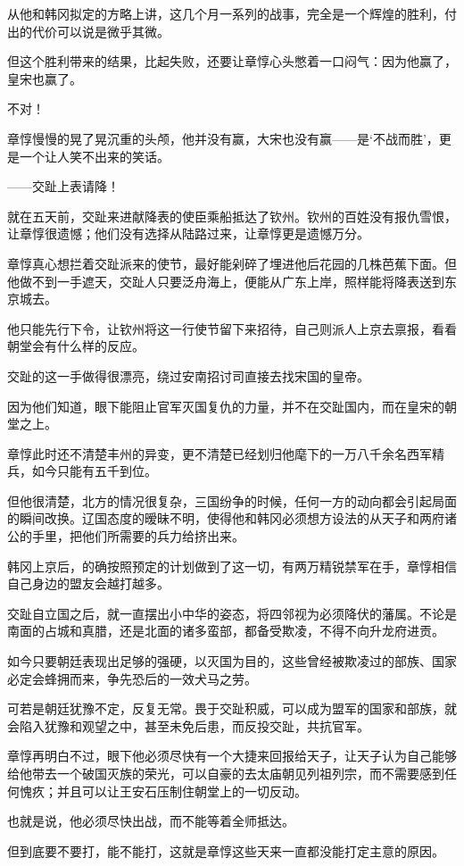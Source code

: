 从他和韩冈拟定的方略上讲，这几个月一系列的战事，完全是一个辉煌的胜利，付出的代价可以说是微乎其微。

但这个胜利带来的结果，比起失败，还要让章惇心头憋着一口闷气：因为他赢了，皇宋也赢了。

不对！

章惇慢慢的晃了晃沉重的头颅，他并没有赢，大宋也没有赢——是‘不战而胜’，更是一个让人笑不出来的笑话。

——交趾上表请降！

就在五天前，交趾来进献降表的使臣乘船抵达了钦州。钦州的百姓没有报仇雪恨，让章惇很遗憾；他们没有选择从陆路过来，让章惇更是遗憾万分。

章惇真心想拦着交趾派来的使节，最好能剁碎了埋进他后花园的几株芭蕉下面。但他做不到一手遮天，交趾人只要泛舟海上，便能从广东上岸，照样能将降表送到东京城去。

他只能先行下令，让钦州将这一行使节留下来招待，自己则派人上京去禀报，看看朝堂会有什么样的反应。

交趾的这一手做得很漂亮，绕过安南招讨司直接去找宋国的皇帝。

因为他们知道，眼下能阻止官军灭国复仇的力量，并不在交趾国内，而在皇宋的朝堂之上。

章惇此时还不清楚丰州的异变，更不清楚已经划归他麾下的一万八千余名西军精兵，如今只能有五千到位。

但他很清楚，北方的情况很复杂，三国纷争的时候，任何一方的动向都会引起局面的瞬间改换。辽国态度的暧昧不明，使得他和韩冈必须想方设法的从天子和两府诸公的手里，把他们所需要的兵力给挤出来。

韩冈上京后，的确按照预定的计划做到了这一切，有两万精锐禁军在手，章惇相信自己身边的盟友会越打越多。

交趾自立国之后，就一直摆出小中华的姿态，将四邻视为必须降伏的藩属。不论是南面的占城和真腊，还是北面的诸多蛮部，都备受欺凌，不得不向升龙府进贡。

如今只要朝廷表现出足够的强硬，以灭国为目的，这些曾经被欺凌过的部族、国家必定会蜂拥而来，争先恐后的一效犬马之劳。

可若是朝廷犹豫不定，反复无常。畏于交趾积威，可以成为盟军的国家和部族，就会陷入犹豫和观望之中，甚至未免后患，而反投交趾，共抗官军。

章惇再明白不过，眼下他必须尽快有一个大捷来回报给天子，让天子认为自己能够给他带去一个破国灭族的荣光，可以自豪的去太庙朝见列祖列宗，而不需要感到任何愧疚；并且可以让王安石压制住朝堂上的一切反动。

也就是说，他必须尽快出战，而不能等着全师抵达。

但到底要不要打，能不能打，这就是章惇这些天来一直都没能打定主意的原因。

